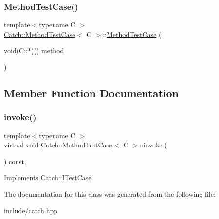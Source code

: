 \subsubsection{\texorpdfstring{Method\+Test\+Case()}{MethodTestCase()}}
{\footnotesize\ttfamily template$<$typename C $>$ \\
\mbox{\hyperlink{class_catch_1_1_method_test_case}{Catch\+::\+Method\+Test\+Case}}$<$ C $>$\+::\mbox{\hyperlink{class_catch_1_1_method_test_case}{Method\+Test\+Case}} (\begin{DoxyParamCaption}\item[{void(C\+::$\ast$)()}]{method }\end{DoxyParamCaption})\hspace{0.3cm}{\ttfamily [inline]}}



\subsection{Member Function Documentation}
\mbox{\label{class_catch_1_1_method_test_case_a4e2263cfa0646f2980768328cb372793}} 
\subsubsection{\texorpdfstring{invoke()}{invoke()}}
{\footnotesize\ttfamily template$<$typename C $>$ \\
virtual void \mbox{\hyperlink{class_catch_1_1_method_test_case}{Catch\+::\+Method\+Test\+Case}}$<$ C $>$\+::invoke (\begin{DoxyParamCaption}{ }\end{DoxyParamCaption}) const\hspace{0.3cm}{\ttfamily [inline]}, {\ttfamily [virtual]}}



Implements \mbox{\hyperlink{struct_catch_1_1_i_test_case_a678825e62e7c17297621cfeb65588c34}{Catch\+::\+I\+Test\+Case}}.



The documentation for this class was generated from the following file\+:\begin{DoxyCompactItemize}
\item 
include/\mbox{\hyperlink{catch_8hpp}{catch.\+hpp}}\end{DoxyCompactItemize}
